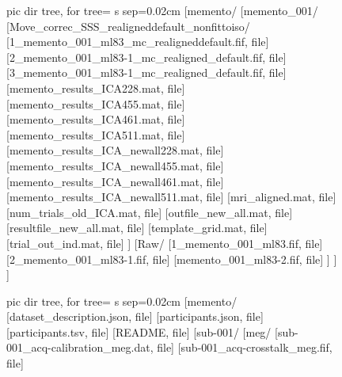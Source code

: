 \begin{figure}
	{\scriptsize
		\begin{minipage}{.49\textwidth}
			\begin{forest}
				pic dir tree,
				for tree={%
					s sep=0.02cm}
				[memento/
				[memento\_001/
				[Move\_correc\_SSS\_realigneddefault\_nonfittoiso/
				[1\_memento\_001\_ml83\_mc\_realigneddefault.fif, file]
				[2\_memento\_001\_ml83-1\_mc\_realigned\_default.fif, file]
				[3\_memento\_001\_ml83-1\_mc\_realigned\_default.fif, file]
				[memento\_results\_ICA228.mat, file]
				[memento\_results\_ICA455.mat, file]
				[memento\_results\_ICA461.mat, file]
				[memento\_results\_ICA511.mat, file]
				[memento\_results\_ICA\_newall228.mat, file]
				[memento\_results\_ICA\_newall455.mat, file]
				[memento\_results\_ICA\_newall461.mat, file]
				[memento\_results\_ICA\_newall511.mat, file]
				[mri\_aligned.mat, file]
				[num\_trials\_old\_ICA.mat, file]
				[outfile\_new\_all.mat, file]
				[resultfile\_new\_all.mat, file]
				[template\_grid.mat, file]
				[trial\_out\_ind.mat, file]
				]
				[Raw/
				[1\_memento\_001\_ml83.fif, file]
				[2\_memento\_001\_ml83-1.fif, file]
				[memento\_001\_ml83-2.fif, file]
				]
				]
				]
			\end{forest}
		\end{minipage}
		\quad
		\begin{minipage}{.49\textwidth}
			\begin{forest}
				pic dir tree,
				for tree={%
					s sep=0.02cm}
				[memento/
				[dataset\_description.json, file]
				[participants.json, file]
				[participants.tsv, file]
				[README, file]
				[sub-001/
				[meg/
				[sub-001\_acq-calibration\_meg.dat, file]
				[sub-001\_acq-crosstalk\_meg.fif, file]

\end{forest}
\end{minipage}}
\end{figure}
